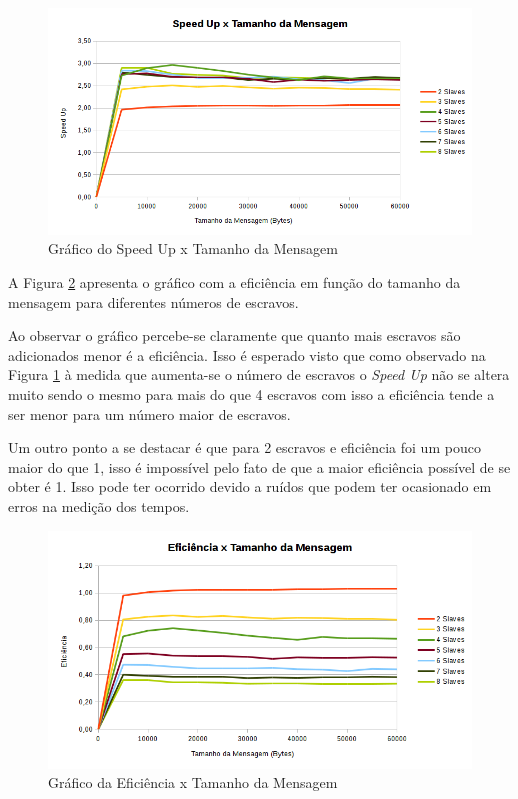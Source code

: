\documentclass[
	12pt,				%
    oneside,			%
	a4paper,			%
	english,			%
	brazil,				%
	]{abntex2}
\begin{document}
\begin{figure}[!htb]
\centering
\includegraphics[scale=0.55]{figuras/speedup_centralizado.png}
\caption{Gráfico do Speed Up x Tamanho da Mensagem}
\label{fig:cent:speedupXtamanho_msg}
\end{figure}

A Figura \ref{fig:cent:eficienciaXtamanho_msg} apresenta o gráfico com a eficiência em função do tamanho da mensagem para 
diferentes números de escravos.

Ao observar o gráfico percebe-se claramente que quanto mais escravos são adicionados menor é a eficiência. Isso é esperado
visto que como observado na Figura \ref{fig:cent:speedupXtamanho_msg} à medida que aumenta-se o número de escravos o \textit{Speed Up} não se altera muito sendo o mesmo para mais do que 4 escravos com isso a eficiência tende a ser menor
para um número maior de escravos.

Um outro ponto a se destacar é que para 2 escravos e eficiência foi um pouco maior do que 1, isso é impossível pelo fato de
que a maior eficiência possível de se obter é 1. Isso pode ter ocorrido devido a ruídos que podem ter ocasionado em erros na
medição dos tempos.

\begin{figure}[!htb]
\centering
\includegraphics[scale=0.55]{figuras/eficiencia_centralizado.png}
\caption{Gráfico da Eficiência x Tamanho da Mensagem}
\label{fig:cent:eficienciaXtamanho_msg}
\end{figure}
\end{document}
